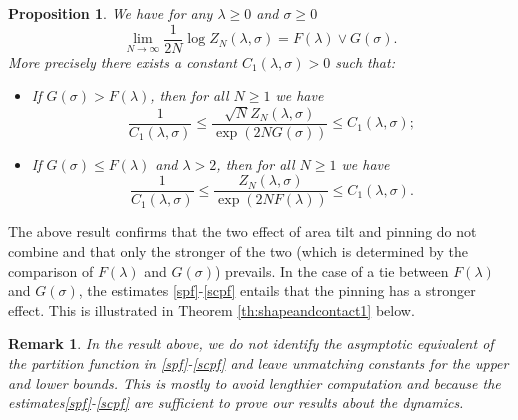 \documentclass[reqno,11pt]{amsart}
\numberwithin{equation}{section}
\newcommand{\gl}{\lambda}
\newtheorem{proposition}[theorem]{Proposition}
\newtheorem{rem}[theorem]{Remark}
\begin{document}
\begin{proposition}\label{th:asymppf} 
We have for any $\gl\ge 0$ and $\sigma\ge 0$ 
\begin{equation}\label{lafreenz}
 \lim_{N\to \infty}  \frac{1}{2N} \log  Z_N(\gl, \sigma)= F(\gl)\vee  G(\sigma).
\end{equation}
More precisely there exists a constant $C_1(\lambda, \sigma)>0$ such that:
\begin{itemize}
\item[(1)]
If $G(\sigma)>F(\lambda)$,  then for all $N\geq 1$ we have
\begin{equation}
 \frac{1}{C_1(\lambda, \sigma)}  \leq \frac{\sqrt{N} Z_N(\lambda, \sigma)}{\exp\left(2N G(\sigma)\right)}\leq C_1(\lambda, \sigma); \label{spf}
\end{equation}
\item[(2)]
If $G(\sigma)\leq F(\lambda)$ and $\gl>2$, then for all $N\geq 1$ we have
\begin{equation}
 \frac{1}{C_1(\lambda, \sigma)}\leq  \frac{Z_N(\lambda, \sigma)}{\exp\left(2N F(\lambda)\right)}\leq C_1(\lambda, \sigma). \label{scpf}
\end{equation}
\end{itemize}

\end{proposition}


 The above result confirms that the two effect of area tilt and pinning do not combine and that only the stronger of the two (which is determined by the comparison of $F(\gl)$ and  $G(\sigma)$) prevails.
 In the case of a tie between $F(\gl)$ and $G(\sigma)$, the estimates \eqref{spf}-\eqref{scpf} entails that the pinning has a stronger effect. This is illustrated in Theorem \ref{th:shapeandcontact1} below.



\begin{rem}
 In the result above, we do not identify the asymptotic equivalent of the partition function in \eqref{spf}-\eqref{scpf} and leave unmatching constants for the upper and lower bounds. This is mostly to avoid lengthier computation and because the estimates\eqref{spf}-\eqref{scpf} are sufficient to prove our results about the dynamics.
 \end{rem}
 
\end{document}
